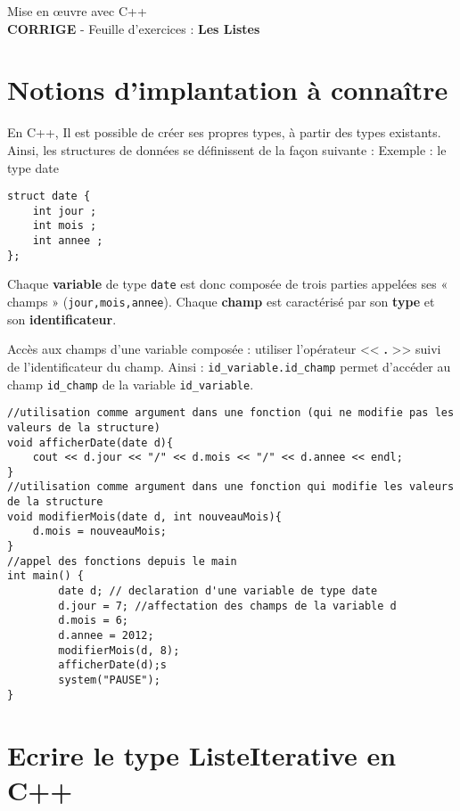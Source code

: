 \documentclass[french]{article}
\begin{document}
	
	\begin{minipage}{\textwidth}
\begin{center}

{\Large Mise en œuvre avec C++ \\ {\color{red}\textbf{CORRIGE}} - Feuille d'exercices : \textbf{Les Listes}}
\end{center}
	\end{minipage}
	
	\section*{Notions d'implantation à connaître}
	En C++, Il est possible de créer ses propres types, à partir des types existants.
	Ainsi, les structures de données se définissent de la façon suivante :
	Exemple : le type date
	
	\begin{lstlisting}[caption={le type \textbf{date}}]
struct date {
	int jour ; 
	int mois ; 
	int annee ;
};
	\end{lstlisting}
	
	Chaque \textbf{variable} de type \texttt{date} est donc composée de trois parties appelées ses « champs » (\texttt{jour,mois,annee}). Chaque \textbf{champ} est caractérisé par son \textbf{type} et son \textbf{identificateur}.
	
	Accès aux champs d'une variable composée : utiliser l’opérateur << \textbf{.} >> suivi de l’identificateur du champ. Ainsi : \texttt{id\_variable.id\_champ} permet d’accéder au champ \texttt{id\_champ} de la variable \texttt{id\_variable}.
	

		\begin{lstlisting}[caption={Utilisation du type date}]
//utilisation comme argument dans une fonction (qui ne modifie pas les valeurs de la structure)
void afficherDate(date d){
    cout << d.jour << "/" << d.mois << "/" << d.annee << endl;
}
//utilisation comme argument dans une fonction qui modifie les valeurs de la structure
void modifierMois(date d, int nouveauMois){
    d.mois = nouveauMois;
}
//appel des fonctions depuis le main
int main() {
    	date d; // declaration d'une variable de type date
    	d.jour = 7; //affectation des champs de la variable d
    	d.mois = 6;
    	d.annee = 2012;
    	modifierMois(d, 8); 
    	afficherDate(d);s
    	system("PAUSE");
}
	\end{lstlisting}
	
	\section{Ecrire le type ListeIterative en C++}
\end{document}
